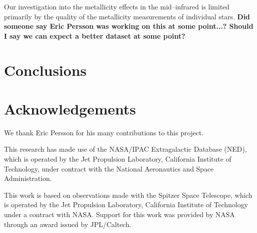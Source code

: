 \documentclass[a4paper,fleqn,usenatbib]{mnras}
\begin{document}
Our investigation into the metallicity effects in the mid--infrared is limited primarily by the quality of the metallicity measurements of individual stars. {\bf Did someone say Eric Persson was working on this at some point...? Should I say we can expect a better dataset at some point?}

\section{Conclusions}
\label{sec:conclusions}

\section*{Acknowledgements}
\label{sec:acknowledgements}

We thank Eric Persson for his many contributions to this project.

This research has made use of the NASA/IPAC Extragalactic Database (NED), which is operated by the Jet Propulsion Laboratory, California Institute of Technology, under contract with the National Aeronautics and Space Administration.
 
This work is based on observations made with the Spitzer Space Telescope, which is operated by the Jet Propulsion Laboratory, California Institute of Technology under a contract with NASA. Support for this work was provided by NASA through an award issued by JPL/Caltech.












\clearpage
\newpage

\appendix
\end{document}
